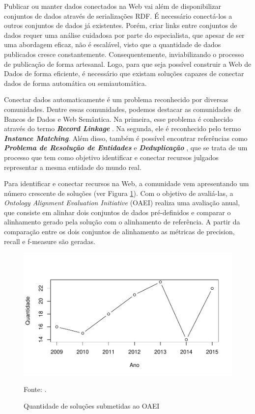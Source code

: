 Publicar ou manter dados conectados na Web vai além de disponibilizar conjuntos de dados através de serializações RDF. É necessário conectá-los a outros conjuntos de dados já existentes. Porém, criar links entre conjuntos de dados requer uma análise cuidadosa por parte do especialista, que apesar de ser uma abordagem eficaz, não é escalável, visto que a quantidade de dados publicados cresce constantemente. Consequentemente, inviabilizando o processo de publicação de forma artesanal. Logo, para que seja possível construir a Web de Dados de forma eficiente, é necessário que existam soluções capazes de conectar dados de forma automática ou semiautomática.

Conectar dados automaticamente é um problema reconhecido por diversas comunidades. Dentre essas comunidades, podemos destacar as comunidades de Bancos de Dados e Web Semântica. Na primeira, esse problema é conhecido através do termo \textbf{\textit{Record Linkage}} \cite{gu2003record}. Na segunda, ele é reconhecido pelo termo \textbf{\textit{Instance Matching}}. Além disso, também é possível encontrar referências como \textbf{\textit{Problema de Resolução de Entidades}} \cite{menestrina2005generic} e \textbf{\textit{Deduplicação}} \cite{sarawagi2002interactive}, que se trata de um processo que tem como objetivo identificar e conectar recursos julgados representar a mesma entidade do mundo real.

Para identificar e conectar recursos na Web, a comunidade vem apresentando um número crescente de soluções (ver Figura \ref{fig:oaei_imtools}). Com o objetivo de avaliá-las, a \textit{Ontology Alignment Evaluation Initiative} (OAEI) realiza uma avaliação anual, que consiste em alinhar dois conjuntos de dados pré-definidos e comparar o alinhamento gerado pela solução com o alinhamento de referência. A partir da comparação entre os dois conjuntos de alinhamento as métricas de precision, recall e f-measure são geradas.

\begin{figure}[!ht]
	\centering
	\includegraphics[width=1\textwidth]{./imagens/im_tools.pdf}
    \caption{Quantidade de soluções submetidas ao OAEI}
	\footnotesize{Fonte: \cite{cheatham2015results}.}
	\label{fig:oaei_imtools}
\end{figure}


